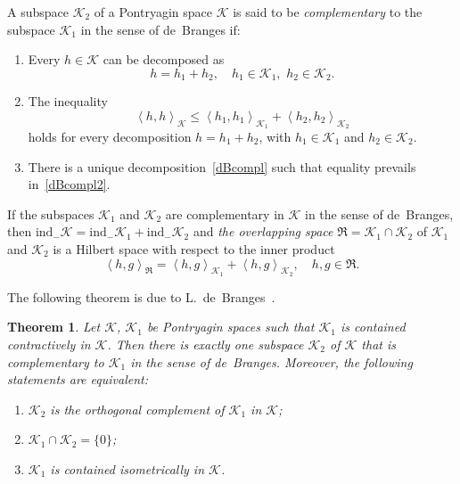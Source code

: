 \documentclass[12pt,twoside,a4paper]{amsart}
\newtheorem{thm}{Theorem}[section]
\theoremstyle{definition}
\numberwithin{equation}{section}
\begin{document}
A subspace ${{\mathcal K}}_2$ of a Pontryagin space ${{\mathcal K}}$ is said to be {\it
complementary} to the subspace ${{\mathcal K}}_1$ in the sense of de~Branges
if:
\begin{enumerate}
\item[\rm(1)]
Every $h\in {{\mathcal K}}$ can be decomposed as
\begin{equation}\label{dBcompl}
    h=h_1+h_2,\quad h_1\in{{\mathcal K}}_1,\,\,h_2\in{{\mathcal K}}_2.
\end{equation}
\item[\rm(2)] The inequality
\begin{equation}\label{dBcompl2}
    \left<h,h\right>_{{\mathcal K}}\le\left<h_1,h_1\right>_{{{\mathcal K}}_1}+\left<h_2,h_2
\right>_{{{\mathcal K}}_2}
\end{equation}
holds for every decomposition $h=h_1+h_2$, with $ h_1\in{{\mathcal K}}_1$ and
$h_2\in{{\mathcal K}}_2$. \vskip 6pt
\item[\rm(3)]
There is a unique decomposition~\eqref{dBcompl} such that
equality prevails in~\eqref{dBcompl2}.
\end{enumerate}
If the subspaces ${{\mathcal K}}_1$ and ${{\mathcal K}}_2$ are complementary in ${{\mathcal K}}$ in
the sense of de~Branges, then
$\mbox{ind}_-{{\mathcal K}}=\mbox{ind}_-{{{\mathcal K}}_1}+\mbox{ind}_-{{{\mathcal K}}_2}$ and {\it
the overlapping space} ${{\mathfrak R}}={{\mathcal K}}_1\cap{{\mathcal K}}_2$ of ${{\mathcal K}}_1$ and ${{\mathcal K}}_2$
is a Hilbert space with respect to the inner product
\begin{equation}\label{Overlap}
  \left<h,g\right>_{{\mathfrak R}}=\left<h,g\right>_{{{\mathcal K}}_1}+\left<h,g\right>_{{{\mathcal K}}_2},\quad
     h,g\in{{\mathfrak R}}.
\end{equation}

The following theorem is due to L.~de~Branges~\cite{dB88}.
\begin{thm}\label{deBrCompl}
Let ${{\mathcal K}}$, ${{\mathcal K}}_1$ be Pontryagin spaces such that ${{\mathcal K}}_1$ is
contained contractively in ${{\mathcal K}}$. Then there is exactly one subspace
${{\mathcal K}}_2$ of ${{\mathcal K}}$ that is complementary to ${{\mathcal K}}_1$ in the sense of
de~Branges. Moreover, the following statements are equivalent:
\begin{enumerate}
\item[\rm(1)]
${{\mathcal K}}_2$ is the orthogonal complement of ${{\mathcal K}}_1$ in ${{\mathcal K}}$; \vskip 6pt
\item[\rm(2)] ${{\mathcal K}}_1\cap{{\mathcal K}}_2=\{0\}$; \vskip 6pt
\item[\rm(3)]
${{\mathcal K}}_1$ is contained isometrically in ${{\mathcal K}}$.
\end{enumerate}
\end{thm}
\end{document}

